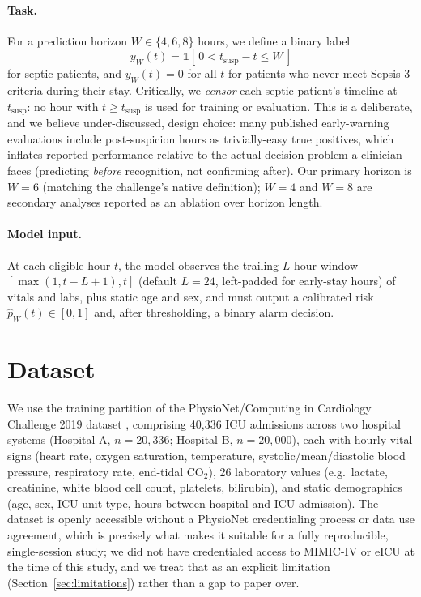 \documentclass[11pt]{article}
\begin{document}
\paragraph{Task.} For a prediction horizon $W \in \{4, 6, 8\}$ hours, we define a binary label
\[
y_W(t) = \mathbb{1}\left[\, 0 < t_{\text{susp}} - t \le W \,\right]
\]
for septic patients, and $y_W(t) = 0$ for all $t$ for patients who never meet Sepsis-3 criteria during their stay. Critically, we \emph{censor} each septic patient's timeline at $t_{\text{susp}}$: no hour with $t \ge t_{\text{susp}}$ is used for training or evaluation. This is a deliberate, and we believe under-discussed, design choice: many published early-warning evaluations include post-suspicion hours as trivially-easy true positives, which inflates reported performance relative to the actual decision problem a clinician faces (predicting \emph{before} recognition, not confirming after). Our primary horizon is $W=6$ (matching the challenge's native definition); $W=4$ and $W=8$ are secondary analyses reported as an ablation over horizon length.

\paragraph{Model input.} At each eligible hour $t$, the model observes the trailing $L$-hour window $[\max(1, t-L+1), t]$ (default $L=24$, left-padded for early-stay hours) of vitals and labs, plus static age and sex, and must output a calibrated risk $\hat p_W(t) \in [0,1]$ and, after thresholding, a binary alarm decision.

\section{Dataset}
\label{sec:dataset}

We use the training partition of the PhysioNet/Computing in Cardiology Challenge 2019 dataset \citep{reyna2019early}, comprising 40{,}336 ICU admissions across two hospital systems (Hospital A, $n=20{,}336$; Hospital B, $n=20{,}000$), each with hourly vital signs (heart rate, oxygen saturation, temperature, systolic/mean/diastolic blood pressure, respiratory rate, end-tidal CO$_2$), 26 laboratory values (e.g.\ lactate, creatinine, white blood cell count, platelets, bilirubin), and static demographics (age, sex, ICU unit type, hours between hospital and ICU admission). The dataset is openly accessible without a PhysioNet credentialing process or data use agreement, which is precisely what makes it suitable for a fully reproducible, single-session study; we did not have credentialed access to MIMIC-IV \citep{johnson2023mimiciv} or eICU \citep{pollard2018eicu} at the time of this study, and we treat that as an explicit limitation (Section~\ref{sec:limitations}) rather than a gap to paper over.
\end{document}
